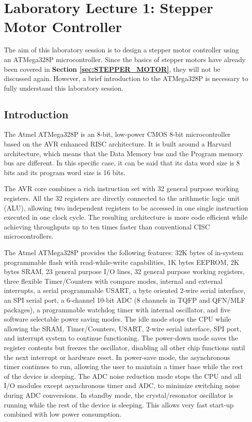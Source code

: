 \section{Laboratory Lecture 1: Stepper Motor Controller}

The aim of this laboratory session is to design a stepper motor controller using an ATMega328P microcontroller. Since the basics of stepper motors have already been covered in \textbf{Section \ref{sec:STEPPER_MOTOR}}, they will not be discussed again. However, a brief introduction to the ATMega328P is necessary to fully understand this laboratory session.

\subsection{Introduction}

The Atmel ATMega328P is an 8-bit, low-power CMOS 8-bit microcontroller based on the AVR enhanced RISC architecture. It is built around a Harvard architecture, which means that the Data Memory bus and the Program memory bus are different. In this specific case, it can be said that its data word size is 8 bits and its program word size is 16 bits.\medskip 

The AVR core combines a rich instruction set with 32 general purpose working registers. All the 32 registers are directly connected to the arithmetic logic unit (ALU), allowing two independent registers to be accessed in one single instruction executed in one clock cycle. The resulting architecture is more code efficient while achieving throughputs up to ten times faster than conventional CISC microcontrollers.\medskip

The Atmel ATMega328P provides the following features: 32K bytes of in-system programmable flash with read-while-write capabilities, 1K bytes EEPROM, 2K bytes SRAM, 23 general purpose I/O lines, 32 general purpose working registers, three flexible Timer/Counters with compare modes, internal and external interrupts, a serial programmable USART, a byte oriented 2-wire serial interface, an SPI serial port, a 6-channel 10-bit ADC (8 channels in TQFP and QFN/MLF packages), a programmable watchdog timer with internal oscillator, and five software selectable power saving modes. The idle mode stops the CPU while allowing the SRAM, Timer/Counters, USART, 2-wire serial interface, SPI port, and interrupt system to continue functioning. The power-down mode saves the register contents but freezes the oscillator, disabling all other chip functions until the next interrupt or hardware reset. In power-save mode, the asynchronous timer continues to run, allowing the user to maintain a timer base while the rest of the device is sleeping. The ADC noise reduction mode stops the CPU and all I/O modules except asynchronous timer and ADC, to minimize switching noise during ADC conversions. In standby mode, the crystal/resonator oscillator is running while the rest of the device is sleeping. This allows very fast start-up combined with low power consumption.\medskip

